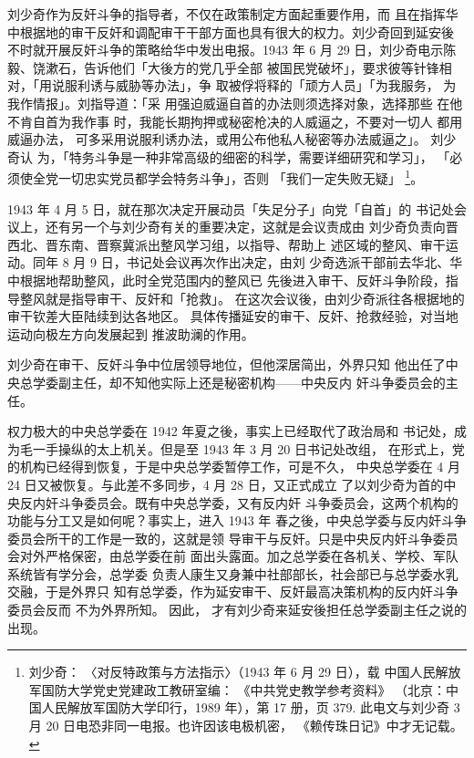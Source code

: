 刘少奇作为反奸斗争的指导者，不仅在政策制定方面起重要作用，而 且在指挥华
中根据地的审干反奸和调配审干干部方面也具有很大的权力。刘少奇回到延安後
不时就开展反奸斗争的策略给华中发出电报。1943 年 6 月 29 日，刘少奇电示陈
毅、饶漱石，告诉他们「大後方的党几乎全部 被国民党破坏」，要求彼等针锋相
对，「用说服利诱与威胁等办法」，争 取被俘将释的「顽方人员」「为我服务，
为我作情报」。刘指导道：「采 用强迫威逼自首的办法则须选择对象，选择那些
在他不肯自首为我作事 时，我能长期拘押或秘密枪决的人威逼之，不要对一切人
都用威逼办法， 可多采用说服利诱办法，或用公布他私人秘密等办法威逼之」。
刘少奇认 为，「特务斗争是一种非常高级的细密的科学，需要详细研究和学习」，
「必须使全党一切忠实党员都学会特务斗争」，否则 「我们一定失败无疑」
\footnote{刘少奇： 〈对反特政策与方法指示〉（1943 年 6 月 29 日），载
中国人民解放军国防大学党史党建政工教研室编： 《中共党史教学参考资料》
（北京：中国人民解放军国防大学印行，1989 年），第 17 册，页 379. 此电文与刘少奇 3 月
20 日电恐非同一电报。也许因该电极机密，
《赖传珠日记》中才无记载。
}。


1943 年 4 月 5 日，就在那次决定开展动员「失足分子」向党「自首」的
书记处会议上，还有另一个与刘少奇有关的重要决定，这就是会议责成由
刘少奇负责向晋西北、晋东南、晋察冀派出整风学习组，以指导、帮助上
述区域的整风、审干运动。同年 8 月 9 日，书记处会议再次作出决定，由刘
少奇选派干部前去华北、华中根据地帮助整风，此时全党范围内的整风已
先後进入审干、反奸斗争阶段，指导整风就是指导审干、反奸和「抢救」。
在这次会议後，由刘少奇派往各根据地的审干钦差大臣陆续到达各地区。
具体传播延安的审干、反奸、抢救经验，对当地运动向极左方向发展起到
推波助澜的作用。

刘少奇在审干、反奸斗争中位居领导地位，但他深居简出，外界只知
他出任了中央总学委副主任，却不知他实际上还是秘密机构——中央反内
奸斗争委员会的主任。

权力极大的中央总学委在 1942 年夏之後，事实上已经取代了政治局和
书记处，成为毛一手操纵的太上机关。但是至 1943 年 3 月 20 日书记处改组，
在形式上，党的机构已经得到恢复，于是中央总学委暂停工作，可是不久，
中央总学委在 4 月 24 日又被恢复。与此差不多同步，4 月 28 日，又正式成立
了以刘少奇为首的中央反内奸斗争委员会。既有中央总学委，又有反内奸
斗争委员会，这两个机构的功能与分工又是如何呢？事实上，进入 1943 年
春之後，中央总学委与反内奸斗争委员会所干的工作是一致的，这就是领
导审干与反奸。只是中央反内奸斗争委员会对外严格保密，由总学委在前
面出头露面。加之总学委在各机关、学校、军队系统皆有学分会，总学委
负责人康生又身兼中社部部长，社会部已与总学委水乳交融，于是外界只
知有总学委，作为延安审干、反奸最高决策机构的反内奸斗争委员会反而
不为外界所知。
因此，
才有刘少奇来延安後担任总学委副主任之说的出现。


